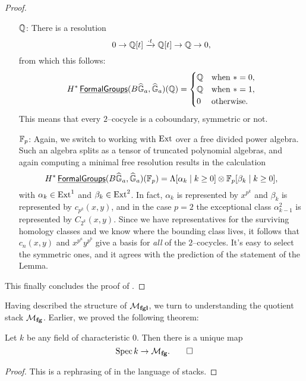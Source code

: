 \begin{proof}
\begin{itemize}
\item[$\mathbb{Q}$:] There is a resolution \[0 \to \mathbb{Q}[t] \xrightarrow{\cdot t} \mathbb{Q}[t] \to \mathbb{Q} \to 0,\] from which this follows: \[H^* \operatorname{\underline{\smash{\mathsf{FormalGroups}}}}(B\widehat{\mathbb G}_a, \widehat{\mathbb G}_a)(\mathbb{Q}) = \begin{cases} \mathbb{Q} & \text{when $* = 0$}, \\ \mathbb{Q} & \text{when $* = 1$}, \\ 0 & \text{otherwise}. \end{cases}\] This means that every $2$--cocycle is a coboundary, symmetric or not.
\item[$\mathbb F_p$:] Again, we switch to working with $\operatorname{Ext}$ over a free divided power algebra.  Such an algebra splits as a tensor of truncated polynomial algebras, and again computing a minimal free resolution results in the calculation \[H^* \operatorname{\underline{\smash{\mathsf{FormalGroups}}}}(B\widehat{\mathbb G}_a, \widehat{\mathbb G}_a)(\mathbb F_p) = \Lambda[\alpha_k \mid k \ge 0] \otimes \mathbb F_p[\beta_k \mid k \ge 0],\] with $\alpha_k \in \operatorname{Ext}^1$ and $\beta_k \in \operatorname{Ext}^2$.  In fact, $\alpha_k$ is represented by $x^{p^k}$ and $\beta_k$ is represented by $c_{p^k}(x, y)$, and in the case $p = 2$ the exceptional class $\alpha_{k-1}^2$ is represented by $C_{2^k}(x, y)$.  Since we have representatives for the surviving homology classes and we know where the bounding class lives, it follows that $c_n(x, y)$ and $x^{p^a} y^{p^b}$ give a basis for \emph{all} of the $2$--cocycles.  It's easy to select the symmetric ones, and it agrees with the prediction of the statement of the Lemma.
\end{itemize}
This finally concludes the proof of .
\end{proof}


Having described the structure of $\mathcal{M}_{\mathbf{fgl}}$, we turn to understanding the quotient stack $\mathcal{M}_{\mathbf{fg}}$.  Earlier, we proved the following theorem:

\begin{theorem}
Let $k$ be any field of characteristic $0$.  Then there is a unique map \[\operatorname{Spec} k \to \mathcal{M}_{\mathbf{fg}}. \qed\]
\end{theorem}
\begin{proof}
This is a rephrasing of  in the language of stacks.
\end{proof}

